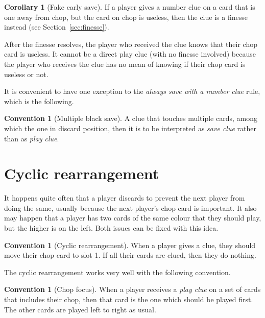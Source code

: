 \documentclass[a4paper]{article}
\theoremstyle{plain}
\theoremstyle{definition}
\newtheorem{corollary}[theorem]{Corollary}
\newtheorem{convention}[theorem]{Convention}
\begin{document}
\begin{corollary}[Fake early save]
	\label{fake-early-save}
	If a player gives a number clue on a card that is one away from chop, but the card on chop is useless, then the clue is a finesse instead (see Section~\ref{sec:finesse}).
\end{corollary}

After the finesse resolves, the player who received the clue knows that their chop card is useless. It cannot be a direct play clue (with no finesse involved) because the player who receives the clue has no mean of knowing if their chop card is useless or not.

It is convenient to have one exception to the \emph{always save with a number clue} rule, which is the following.

\begin{convention}[Multiple black save]
	A  clue that touches multiple cards, among which the one in discard position, then it is to be interpreted as \emph{save clue} rather than as \emph{play clue}.
\end{convention}

\section{Cyclic rearrangement}

It happens quite often that a player discards to prevent the next player from doing the same, usually because the next player's chop card is important. It also may happen that a player has two cards of the same colour that they should play, but the higher is on the left. Both issues can be fixed with this idea.

\begin{convention}[Cyclic rearrangement]
	\label{cyclic-rearrangement}
	When a player gives a clue, they should move their chop card to slot 1. If all their cards are clued, then they do nothing.
\end{convention}

The cyclic rearrangement works very well with the following convention.

\begin{convention}[Chop focus]
	\label{chop-focus}
	When a player receives a \emph{play clue} on a set of cards that includes their chop, then that card is the one which should be played first. The other cards are played left to right as usual.
\end{convention}
\end{document}
